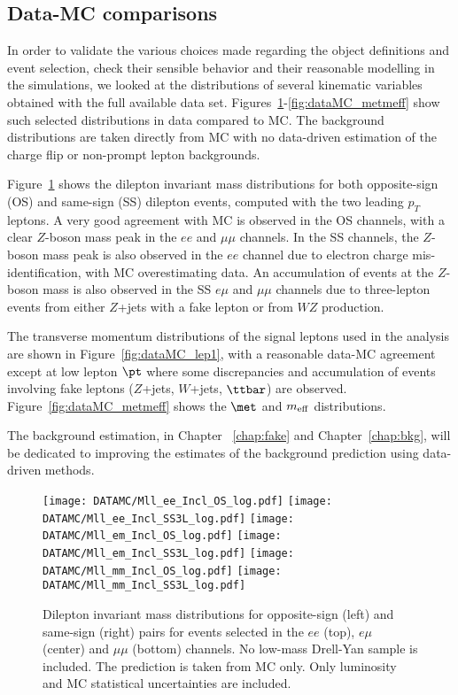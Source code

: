\subsection{Data-MC comparisons}
\label{subsec:sec.strategy.selection_DataMC}


In order to validate the various choices made regarding the object definitions and event selection, 
check their sensible behavior and their reasonable modelling in the simulations, 
we looked at the distributions of several kinematic variables obtained with the full available data set.
Figures~\ref{fig:dataMC_2lep}-\ref{fig:dataMC_metmeff} show such selected distributions in data compared to MC. 
The background distributions are taken directly from MC with no data-driven estimation of the charge flip or non-prompt lepton backgrounds.

Figure~\ref{fig:dataMC_2lep} shows the dilepton invariant mass distributions for both opposite-sign (OS) and same-sign (SS) dilepton events, 
computed with the two leading $p_T$ leptons. 
A very good agreement with MC is observed in the OS channels, with a clear $Z$-boson mass peak in the $ee$ and $\mu\mu$ channels. 
In the SS channels, the $Z$-boson mass peak is also observed in the $ee$ channel due to electron charge mis-identification, with MC overestimating data. 
An accumulation of events at the $Z$-boson mass is also observed in the SS $e\mu$ and $\mu\mu$ channels due to three-lepton events 
from either $Z$+jets with a fake lepton or from $WZ$ production.  

The transverse momentum distributions of the signal leptons used in the analysis are shown in Figure~\ref{fig:dataMC_lep1}, with a reasonable data-MC agreement except at low 
lepton $\pt$ where some discrepancies and accumulation of events involving fake leptons ($Z$+jets, $W$+jets, $\ttbar$) are observed. 
Figure~\ref{fig:dataMC_metmeff} shows the $\met$ and $m_{\rm eff}$ distributions.

The background estimation, in Chapter ~\ref{chap:fake} and Chapter~\ref{chap:bkg}, will be dedicated to improving the estimates of the background prediction using data-driven methods.

\begin{figure}[htb!]
\centering
{\texttt{[image: DATAMC/Mll\_ee\_Incl\_OS\_log.pdf]}}
{\texttt{[image: DATAMC/Mll\_ee\_Incl\_SS3L\_log.pdf]}}
{\texttt{[image: DATAMC/Mll\_em\_Incl\_OS\_log.pdf]}}
{\texttt{[image: DATAMC/Mll\_em\_Incl\_SS3L\_log.pdf]}}
{\texttt{[image: DATAMC/Mll\_mm\_Incl\_OS\_log.pdf]}}
{\texttt{[image: DATAMC/Mll\_mm\_Incl\_SS3L\_log.pdf]}}
\caption{Dilepton invariant mass distributions for opposite-sign (left) and same-sign (right) pairs for events selected in the $ee$ (top), $e\mu$ (center) and $\mu\mu$ (bottom) channels. No low-mass Drell-Yan sample is included. 
 The prediction is taken from MC only.
Only luminosity and MC statistical uncertainties are included.
}
\label{fig:dataMC_2lep}
\end{figure}

